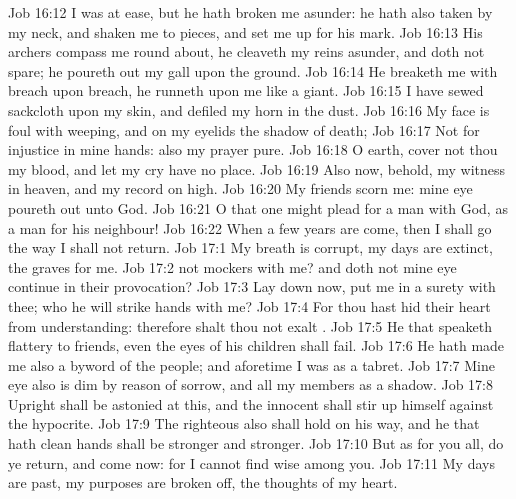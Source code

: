 \vs Job 16:12 I was at ease, but he hath broken me asunder: he hath also taken  by my neck, and shaken me to pieces, and set me up for his mark.
\vs Job 16:13 His archers compass me round about, he cleaveth my reins asunder, and doth not spare; he poureth out my gall upon the ground.
\vs Job 16:14 He breaketh me with breach upon breach, he runneth upon me like a giant.
\vs Job 16:15 I have sewed sackcloth upon my skin, and defiled my horn in the dust.
\vs Job 16:16 My face is foul with weeping, and on my eyelids  the shadow of death;
\vs Job 16:17 Not for  injustice in mine hands: also my prayer  pure.
\vs Job 16:18 O earth, cover not thou my blood, and let my cry have no place.
\vs Job 16:19 Also now, behold, my witness  in heaven, and my record  on high.
\vs Job 16:20 My friends scorn me:  mine eye poureth out  unto God.
\vs Job 16:21 O that one might plead for a man with God, as a man  for his neighbour!
\vs Job 16:22 When a few years are come, then I shall go the way  I shall not return.
\vs Job 17:1 My breath is corrupt, my days are extinct, the graves  for me.
\vs Job 17:2  not mockers with me? and doth not mine eye continue in their provocation?
\vs Job 17:3 Lay down now, put me in a surety with thee; who  he  will strike hands with me?
\vs Job 17:4 For thou hast hid their heart from understanding: therefore shalt thou not exalt .
\vs Job 17:5 He that speaketh flattery to  friends, even the eyes of his children shall fail.
\vs Job 17:6 He hath made me also a byword of the people; and aforetime I was as a tabret.
\vs Job 17:7 Mine eye also is dim by reason of sorrow, and all my members  as a shadow.
\vs Job 17:8 Upright  shall be astonied at this, and the innocent shall stir up himself against the hypocrite.
\vs Job 17:9 The righteous also shall hold on his way, and he that hath clean hands shall be stronger and stronger.
\vs Job 17:10 But as for you all, do ye return, and come now: for I cannot find  wise  among you.
\vs Job 17:11 My days are past, my purposes are broken off,  the thoughts of my heart.
